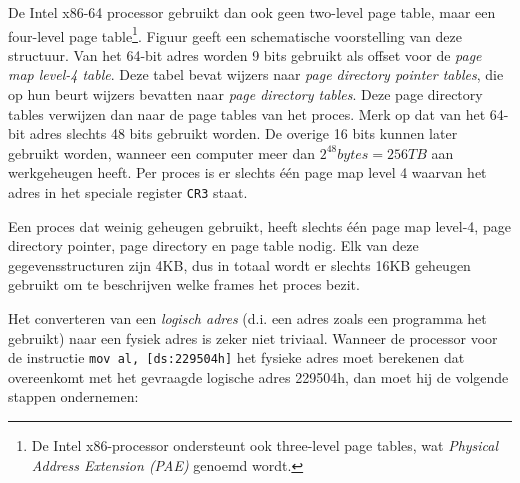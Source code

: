 De Intel x86-64 processor gebruikt dan ook geen two-level page table, maar een four-level page table\footnote{De Intel x86-processor ondersteunt ook three-level page tables, wat \emph{Physical Address Extension (PAE)} genoemd wordt.}. Figuur  geeft een schematische voorstelling van deze structuur. Van het 64-bit adres worden 9 bits gebruikt als offset voor de \emph{page map level-4 table}. Deze tabel bevat wijzers naar \emph{page directory pointer tables}, die op hun beurt wijzers bevatten naar \emph{page directory tables}. Deze page directory tables verwijzen dan naar de page tables van het proces. Merk op dat van het 64-bit adres slechts 48 bits gebruikt worden. De overige 16 bits kunnen later gebruikt worden, wanneer een computer meer dan $2^{48} bytes = 256TB$ aan werkgeheugen heeft. Per proces is er slechts \'e\'en page map level 4 waarvan het adres in het speciale register \texttt{CR3} staat.

Een proces dat weinig geheugen gebruikt, heeft slechts \'e\'en page map level-4, page directory pointer, page directory en page table nodig. Elk van deze gegevensstructuren zijn 4KB, dus in totaal wordt er slechts 16KB geheugen gebruikt om te beschrijven welke frames het proces bezit.


Het converteren van een \emph{logisch adres} (d.i. een adres zoals een programma het gebruikt) naar een fysiek adres is zeker niet triviaal. Wanneer de processor voor de instructie \texttt{mov al, [ds:229504h]} het fysieke adres moet berekenen dat overeenkomt met het gevraagde logische adres 229504h, dan moet hij de volgende stappen ondernemen:

